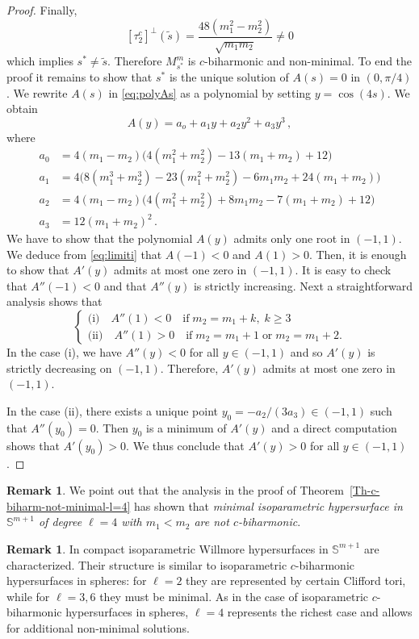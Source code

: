 \documentclass[11pt,leqno]{amsart}
\theoremstyle{plain}
\theoremstyle{definition}
\newtheorem{remark}       [theorem]  {Remark}
\numberwithin{equation}{section}
\def \s{{\mathbb S}}
\numberwithin{equation}{section}
\begin{document}
{\begin{proof}
Finally, 
\[
[\tau_2^c]^\perp(\tilde{s})= \frac{48 (m_1^2-m_2^2)}{\sqrt{m_1 m_2}}   \neq 0
\]
which implies $s^*\neq \tilde{s}$. Therefore $M_{s^*}^m$ is $c$-biharmonic and non-minimal.
To end the proof it remains to show that $s^*$ is the unique solution of $A(s)=0$ in $(0,\pi/4)$. We rewrite $A(s)$ in \eqref{eq:polyAs} as a polynomial by setting $y=\cos(4s)$.  We obtain
\begin{equation}\label{eq:polyAy}
A(y)=a_o+a_1y+a_2y^2+a_3y^3\,,
\end{equation}
where
\[
\begin{aligned}
a_0 &= 4 (m_1 - m_2) \big(4(m_1^2+m_2^2)-13(m_1+m_2)+12\big)\\
a_1 &=  4 \big(8 (m_1^3+ m_2^3) -23(m_1^2+m_2^2)-6m_1 m_2+24(m_1+m_2)\big)\\
a_2 &= 4 (m_1 - m_2) \big(4(m_1^2+m_2^2)+8m_1 m_2-7(m_1+m_2)+12\big)\\
a_3 &= 12 (m_1 + m_2)^2\,.
\end{aligned}
\]
We have to show that the polynomial $A(y)$ admits only one root in $(-1,1)$. We deduce from \eqref{eq:limiti} that  $A(-1)<0$  and $A(1)>0$.
Then, it is enough to show that $A'(y)$ admits at most one zero in $(-1,1)$. It is easy to check that $A''(-1)<0$ and that $A''(y)$ is strictly increasing. Next a straightforward analysis shows that
\[
\begin{cases}  \text{(i)} \quad A''(1)<0 \quad \text{if}\; m_2=m_1+k, \; k\geq 3\\ 
\text{(ii)} \quad A''(1)>0 \quad \text{if}\; m_2=m_1+1 \;\text{or}\; m_2=m_1+2.
\end{cases}
\]
In the case (i), we have $A''(y)<0$ for all $y\in (-1,1)$ and so $A'(y)$ is strictly decreasing on $(-1,1)$. Therefore, $A'(y)$ admits at most one zero in $(-1,1)$.

In the case (ii), there exists a unique point $y_0=-a_2/(3a_3)\in(-1,1)$ such that $A''(y_0)=0$. Then $y_0$ is a minimum of $A'(y)$ and a direct computation shows that $A'(y_0)>0$. We thus conclude that $A'(y)>0$ for all $y\in(-1,1)$.
\end{proof}

 
 \begin{remark}
We point out that the analysis in the proof of Theorem~\ref{Th-c-biharm-not-minimal-l=4} has shown that \textit{minimal isoparametric hypersurface in $\s^{m+1}$ of degree $\ell=4$ with $m_1< m_2$ are not $c$-biharmonic}.
 \end{remark}
 
 \begin{remark}
In \cite[Theorem 5.1]{MR1868938} compact isoparametric Willmore hypersurfaces in
\(\s^{m+1}\) are characterized. Their structure is similar to isoparametric $c$-biharmonic hypersurfaces in spheres: for \(\ell=2\) they are represented by certain Clifford tori,
while for \(\ell=3,6\) they must be minimal. As in the case of isoparametric $c$-biharmonic hypersurfaces in spheres, \(\ell=4\) represents the richest case and allows for additional non-minimal solutions.
\end{remark}

}
\end{document}

